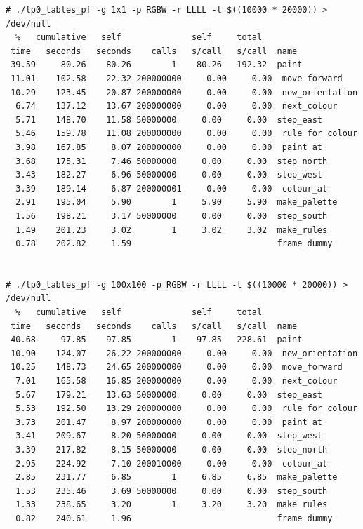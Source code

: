 \documentclass[a4paper, 10pt, twoside, notitlepage]{article}
\begin{document}
\scriptsize
\begin{verbatim}
# ./tp0_tables_pf -g 1x1 -p RGBW -r LLLL -t $((10000 * 20000)) > /dev/null
  %   cumulative   self              self     total           
 time   seconds   seconds    calls   s/call   s/call  name    
 39.59     80.26    80.26        1    80.26   192.32  paint
 11.01    102.58    22.32 200000000     0.00     0.00  move_forward
 10.29    123.45    20.87 200000000     0.00     0.00  new_orientation
  6.74    137.12    13.67 200000000     0.00     0.00  next_colour
  5.71    148.70    11.58 50000000     0.00     0.00  step_east
  5.46    159.78    11.08 200000000     0.00     0.00  rule_for_colour
  3.98    167.85     8.07 200000000     0.00     0.00  paint_at
  3.68    175.31     7.46 50000000     0.00     0.00  step_north
  3.43    182.27     6.96 50000000     0.00     0.00  step_west
  3.39    189.14     6.87 200000001     0.00     0.00  colour_at
  2.91    195.04     5.90        1     5.90     5.90  make_palette
  1.56    198.21     3.17 50000000     0.00     0.00  step_south
  1.49    201.23     3.02        1     3.02     3.02  make_rules
  0.78    202.82     1.59                             frame_dummy


# ./tp0_tables_pf -g 100x100 -p RGBW -r LLLL -t $((10000 * 20000)) > /dev/null
  %   cumulative   self              self     total           
 time   seconds   seconds    calls   s/call   s/call  name    
 40.68     97.85    97.85        1    97.85   228.61  paint
 10.90    124.07    26.22 200000000     0.00     0.00  new_orientation
 10.25    148.73    24.65 200000000     0.00     0.00  move_forward
  7.01    165.58    16.85 200000000     0.00     0.00  next_colour
  5.67    179.21    13.63 50000000     0.00     0.00  step_east
  5.53    192.50    13.29 200000000     0.00     0.00  rule_for_colour
  3.73    201.47     8.97 200000000     0.00     0.00  paint_at
  3.41    209.67     8.20 50000000     0.00     0.00  step_west
  3.39    217.82     8.15 50000000     0.00     0.00  step_north
  2.95    224.92     7.10 200010000     0.00     0.00  colour_at
  2.85    231.77     6.85        1     6.85     6.85  make_palette
  1.53    235.46     3.69 50000000     0.00     0.00  step_south
  1.33    238.65     3.20        1     3.20     3.20  make_rules
  0.82    240.61     1.96                             frame_dummy



\end{verbatim}
\end{document}
